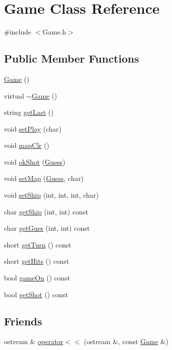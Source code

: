 \hypertarget{class_game}{}\section{Game Class Reference}
\label{class_game}


{\ttfamily \#include $<$Game.\+h$>$}

\subsection*{Public Member Functions}
\begin{DoxyCompactItemize}
\item 
\hyperlink{class_game_ad59df6562a58a614fda24622d3715b65}{Game} ()
\item 
virtual \hyperlink{class_game_ae3d112ca6e0e55150d2fdbc704474530}{$\sim$\+Game} ()
\item 
string \hyperlink{class_game_ab9f516c5cca41cf4807dc71108af4257}{get\+Last} ()
\item 
void \hyperlink{class_game_a9acc18b29b10e44174bb4c0c59886469}{set\+Play} (char)
\item 
void \hyperlink{class_game_a35e06b7cc99e0577418a5187b4b561ca}{map\+Clr} ()
\item 
void \hyperlink{class_game_ab9025f2355418561b9e406dd4b5da02a}{ok\+Shot} (\hyperlink{class_guess}{Guess})
\item 
void \hyperlink{class_game_a4e23ede628f25d35813322e4e3f46b01}{set\+Map} (\hyperlink{class_guess}{Guess}, char)
\item 
void \hyperlink{class_game_aa4612d0ad265babef74c3a1122d0a395}{set\+Ship} (int, int, int, char)
\item 
char \hyperlink{class_game_ac6012fc1a6b2488e87e0212a5cbd6400}{get\+Ship} (int, int) const 
\item 
char \hyperlink{class_game_a524880affa0350bb77a2e9ea3199512d}{get\+Gues} (int, int) const 
\item 
short \hyperlink{class_game_a91a534be86fc44895bdf01d9da72603f}{get\+Turn} () const 
\item 
short \hyperlink{class_game_a35cfb1ebe7f3241f3f0fbe88f466602e}{get\+Hits} () const 
\item 
bool \hyperlink{class_game_a05ba5ff17c3d9fcba92187c3e6fcb929}{game\+On} () const 
\item 
bool \hyperlink{class_game_af28e7d936753343ceccdccaf58da4971}{get\+Shot} () const 
\end{DoxyCompactItemize}
\subsection*{Friends}
\begin{DoxyCompactItemize}
\item 
ostream \& \hyperlink{class_game_a7bb9176e07b6f6c73c930dba6400265f}{operator$<$$<$} (ostream \&, const \hyperlink{class_game}{Game} \&)
\end{DoxyCompactItemize}


